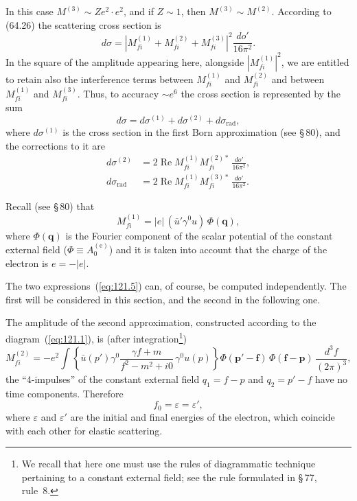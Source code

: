 \noindent In this case $M^{(3)} \sim Ze^2 \cdot e^2$, and if $Z \sim 1$, then $M^{(3)} \sim M^{(2)}$. According to (64.26) the scattering cross section is
\begin{equation}
d\sigma = |M_{fi}^{(1)} + M_{fi}^{(2)} + M_{fi}^{(3)}|^2 \frac{do'}{16\pi^2}.
\label{eq:121.3}
\end{equation}
In the square of the amplitude appearing here, alongside $|M_{fi}^{(1)}|^2$, we are entitled to retain also the interference terms between $M_{fi}^{(1)}$ and $M_{fi}^{(2)}$ and between $M_{fi}^{(1)}$ and $M_{fi}^{(3)}$. Thus, to accuracy $\sim e^6$ the cross section is represented by the sum
\begin{equation}
d\sigma = d\sigma^{(1)} + d\sigma^{(2)} + d\sigma_{\text{rad}},
\label{eq:121.4}
\end{equation}
where $d\sigma^{(1)}$ is the cross section in the first Born approximation (see \S\,80), and the corrections to it are
\begin{equation}
\begin{split}
d\sigma^{(2)} &= 2\operatorname{Re} M_{fi}^{(1)} M_{fi}^{(2)*}\,\frac{do'}{16\pi^2},\\
d\sigma_{\text{rad}} &= 2\operatorname{Re} M_{fi}^{(1)} M_{fi}^{(3)*}\,\frac{do'}{16\pi^2}.
\end{split}
\label{eq:121.5}
\end{equation}

Recall (see \S\,80) that
\begin{equation}
M_{fi}^{(1)} = |e|\,(\bar{u}'\gamma^0 u)\,\Phi(\mathbf{q}),
\label{eq:121.6}
\end{equation}
where $\Phi(\mathbf{q})$ is the Fourier component of the scalar potential of the constant external field ($\Phi \equiv A_0^{(\mathrm{e})}$) and it is taken into account that the charge of the electron is $e = -|e|$.

The two expressions~(\ref{eq:121.5}) can, of course, be computed independently. The first will be considered in this section, and the second in the following one.

The amplitude of the second approximation, constructed according to the diagram~(\ref{eq:121.1}), is (after integration\footnote{We recall that here one must use the rules of diagrammatic technique pertaining to a constant external field; see the rule formulated in \S\,77, rule~8.})
\begin{equation}
M_{fi}^{(2)} = -e^2 \int \left\{\bar{u}(p')\gamma^0 \frac{\gamma f + m}{f^2 - m^2 + i0}\,\gamma^0 u(p)\right\} \Phi(\mathbf{p}' - \mathbf{f})\,\Phi(\mathbf{f} - \mathbf{p})\,\frac{d^3\!f}{(2\pi)^3},
\label{eq:121.7}
\end{equation}
the ``4-impulses'' of the constant external field $q_1 = f - p$ and $q_2 = p' - f$ have no time components. Therefore
\begin{equation}
f_0 = \varepsilon = \varepsilon',
\label{eq:121.8}
\end{equation}
where $\varepsilon$ and $\varepsilon'$ are the initial and final energies of the electron, which coincide with each other for elastic scattering.

